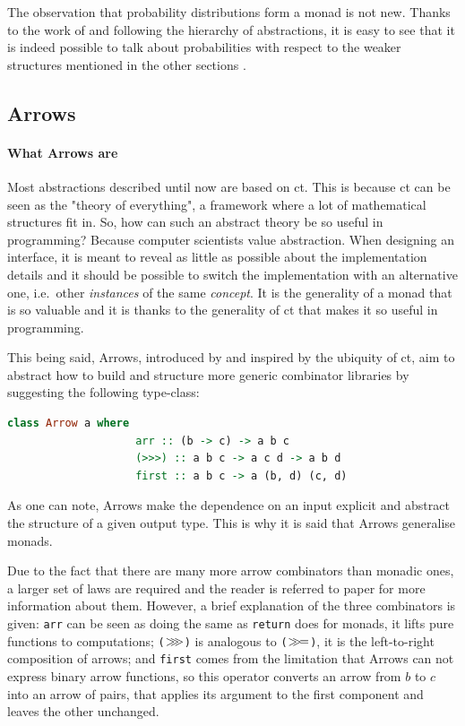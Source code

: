 \documentclass[
  oneside,
  11pt, a4paper,
  footinclude=true,
  headinclude=true,
  cleardoublepage=empty
]{scrbook}
\theoremstyle{definition}
\theoremstyle{definition}
\def\bind{\mathbin{{>\hskip-1ex>\hskip-.4ex=}}}
\def\bindA{\mathbin{{>\hskip-1ex>\hskip-1ex>}}}
\begin{document}
	The observation that probability distributions form a monad is not new. Thanks to the work of \cite{giry1982} and following the hierarchy of abstractions, it is easy to see that it is indeed possible to talk about probabilities with respect to the weaker structures mentioned in the other sections \citep{jtobin, Scibior19}.
	            
	    \subsection{Arrows}
	    
	        \paragraph{What Arrows are}
	        
    Most abstractions described until now are based on \gls{ct}. This is because \gls{ct} can be seen as the "theory of everything", a framework where a lot of mathematical structures fit in. So, how can such an abstract theory be so useful in programming? Because computer scientists value abstraction. When designing an interface, it is meant to reveal as little as possible about the implementation details and it should be possible to switch the implementation with an alternative one, i.e.\ other \emph{instances} of the same \emph{concept}. It is the generality of a monad that is so valuable and it is thanks to the generality of \gls{ct} that makes it so useful in programming.
    	        
    This being said, Arrows, introduced by \cite{Hughes:2000:GMA:347238.347246} and inspired by the ubiquity of \gls{ct}, aim to abstract how to build and structure more generic combinator libraries by suggesting the following type-class:
    	        
                \begin{lstlisting}[language=Haskell, caption={Arrow type-class},captionpos=b]
                class Arrow a where
                    arr :: (b -> c) -> a b c
                    (>>>) :: a b c -> a c d -> a b d
                    first :: a b c -> a (b, d) (c, d)
    	        \end{lstlisting}{}
    	       
    As one can note, Arrows make the dependence on an input explicit and abstract the structure of a given output type. This is why it is said that Arrows generalise monads.
    	       
    Due to the fact that there are many more arrow combinators than monadic ones, a larger set of laws are required and the reader is referred to \cite{Hughes:2000:GMA:347238.347246} paper for more information about them. However, a brief explanation of the three combinators is given: \texttt{arr} can be seen as doing the same as \texttt{return} does for monads, it lifts pure functions to computations; \texttt{($\bindA$)} is analogous to \texttt{($\bind$)}, it is the left-to-right composition of arrows; and \texttt{first} comes from the limitation that Arrows can not express binary arrow functions, so this operator converts an arrow from $b$ to $c$ into an arrow of pairs, that applies its argument to the first component and leaves the other unchanged.
    	       
\end{document}
